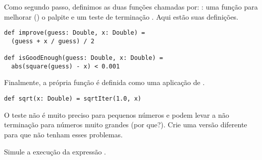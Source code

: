 Como segundo passo, definimos as duas fun\c{c}\~{o}es chamadas por:
: uma fun\c{c}\~{a}o para melhorar () o palpite e um
teste de termina\c{c}\~{a}o . Aqui est\~{a}o suas defini\c{c}\~{o}es.
\begin{lstlisting}
def improve(guess: Double, x: Double) =
  (guess + x / guess) / 2    

def isGoodEnough(guess: Double, x: Double) =
  abs(square(guess) - x) < 0.001
\end{lstlisting}

Finalmente, a pr\'{o}pria fun\c{c}\~{a}o  \'{e} definida como uma aplica\c{c}\~{a}o de
.
  
\begin{lstlisting}
def sqrt(x: Double) = sqrtIter(1.0, x)
\end{lstlisting}


\begin{exercise} O teste  n\~{a}o \'{e} muito preciso para pequenos 
n\'{u}meros e podem levar a n\~{a}o termina\c{c}\~{a}o para n\'{u}meros muito grandes (por que?).
Crie uma vers\~{a}o diferente para  que n\~{a}o tenham esses problemas.
\end{exercise}

\begin{exercise} Simule a execu\c{c}\~{a}o da express\~{a}o .
\end{exercise}


